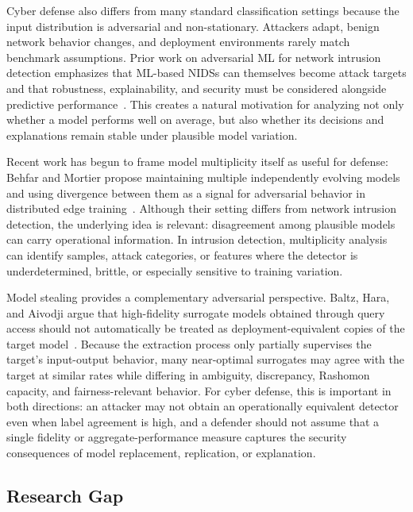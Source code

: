Cyber defense also differs from many standard classification settings because the input distribution is adversarial and non-stationary. Attackers adapt, benign network behavior changes, and deployment environments rarely match benchmark assumptions. Prior work on adversarial \gls{ML} for network intrusion detection emphasizes that \gls{ML}-based \glspl{NIDS} can themselves become attack targets and that robustness, explainability, and security must be considered alongside predictive performance~\cite{pawlicki2020defending,choras2020machine}. This creates a natural motivation for analyzing not only whether a model performs well on average, but also whether its decisions and explanations remain stable under plausible model variation.

Recent work has begun to frame model multiplicity itself as useful for defense: Behfar and Mortier propose maintaining multiple independently evolving models and using divergence between them as a signal for adversarial behavior in distributed edge training~\cite{behfar2026model}. Although their setting differs from network intrusion detection, the underlying idea is relevant: disagreement among plausible models can carry operational information. In intrusion detection, multiplicity analysis can identify samples, attack categories, or features where the detector is underdetermined, brittle, or especially sensitive to training variation.

Model stealing provides a complementary adversarial perspective. Baltz, Hara, and Aivodji argue that high-fidelity surrogate models obtained through query access should not automatically be treated as deployment-equivalent copies of the target model~\cite{baltz2026model}. Because the extraction process only partially supervises the target's input-output behavior, many near-optimal surrogates may agree with the target at similar rates while differing in ambiguity, discrepancy, Rashomon capacity, and fairness-relevant behavior. For cyber defense, this is important in both directions: an attacker may not obtain an operationally equivalent detector even when label agreement is high, and a defender should not assume that a single fidelity or aggregate-performance measure captures the security consequences of model replacement, replication, or explanation.


\subsection{Research Gap}

